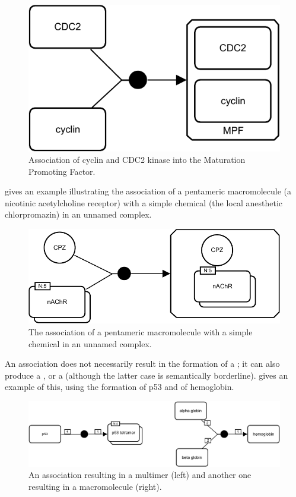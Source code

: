 \begin{figure}[H]
  \centering
  \includegraphics[scale = 0.8]{images/build/association_mpf_example.pdf}
  \caption{Association of cyclin and CDC2 kinase into the Maturation Promoting Factor.}
  \label{fig:assoc-cyclin}
\end{figure}

 gives an example illustrating the association of a pentameric macromolecule (a nicotinic acetylcholine receptor) with a simple chemical (the local anesthetic chlorpromazin) in an unnamed complex.

\begin{figure}[H]
  \centering
  \includegraphics[scale = 0.8]{images/build/association_unamed_example.pdf}
  \caption{The association of a pentameric macromolecule with a simple chemical in an unnamed complex.}
  \label{fig:assoc-unamed}
\end{figure}

An association does not necessarily result in the formation of a ; it can also produce a , or a  (although the latter case is semantically borderline).   gives an example of this, using the formation of p53 and of hemoglobin.

\begin{figure}[H]
  \centering
  \includegraphics[scale = 0.68]{images/build/association_multimerisation_example.pdf}
  \caption{An association resulting in a multimer (left) and another one resulting in a macromolecule (right).}
  \label{fig:assoc-multi}
\end{figure}
